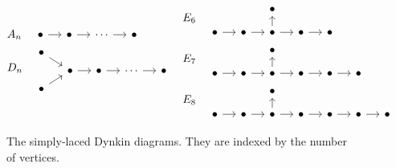 \begin{figure}[ht]
	\centering
	\begin{align*}
		 &
		\begin{aligned}
			 & A_n \quad \begin{tikzcd}[ampersand replacement=\&, sep=small]
				             \bullet \rar \& \bullet \rar \&\dotsb \rar \&\bullet
			             \end{tikzcd}                    \\
			 & D_n \quad \begin{tikzcd}[ampersand replacement=\&, sep=small, row sep=tiny]
				             \bullet\drar\&\&\&\& \\
				             \&\bullet \rar \& \bullet \rar \&\dotsb \rar \& \bullet \\
				             \bullet\urar\&\&\&\&
			             \end{tikzcd}
		\end{aligned}
		 &   &
		\begin{aligned}
			 & E_6 \quad \begin{tikzcd}[ampersand replacement=\&, sep=small]
				             \&\&\bullet\\
				             \bullet \rar \& \bullet \rar \&\bullet \rar\uar \& \bullet \rar \& \bullet
			             \end{tikzcd}                                \\
			 & E_7 \quad \begin{tikzcd}[ampersand replacement=\&, sep=small]
				             \&\&\bullet\\
				             \bullet \rar \& \bullet \rar \&\bullet \rar\uar \& \bullet \rar \& \bullet \rar \& \bullet
			             \end{tikzcd}                \\
			 & E_8 \quad \begin{tikzcd}[ampersand replacement=\&, sep=small]
				             \&\&\bullet\\
				             \bullet \rar \& \bullet \rar \&\bullet \rar\uar \& \bullet \rar \& \bullet \rar \& \bullet\rar \& \bullet
			             \end{tikzcd}
		\end{aligned}
	\end{align*}

	\caption{The simply-laced Dynkin diagrams. They are indexed by the number of vertices.}
	\label{fig:dynkin_diagrams_ade}
\end{figure}

